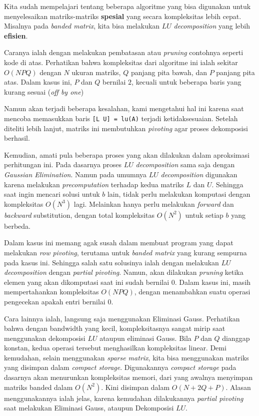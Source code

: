 \documentclass[12pt, a4paper, onecolumn, oneside, final]{report}
\begin{document}
Kita sudah mempelajari tentang beberapa algoritme yang bisa digunakan untuk menyelesaikan matriks-matriks \textbf{spesial} yang secara kompleksitas lebih cepat. Misalnya pada \textit{banded matrix}, kita bisa melakukan $LU$ \textit{decomposition} yang lebih \textbf{efisien}.

Caranya ialah dengan melakukan pembatasan atau \textit{pruning} contohnya seperti kode di atas. Perhatikan bahwa kompleksitas dari algoritme ini ialah sekitar $O(NPQ)$ dengan $N$ ukuran matriks, $Q$ panjang pita bawah, dan $P$ panjang pita atas. Dalam kasus ini, $P$ dan $Q$ bernilai $2$, kecuali untuk beberapa baris yang kurang sesuai (\textit{off by one})

Namun akan terjadi beberapa kesalahan, kami mengetahui hal ini karena saat mencoba memasukkan baris \texttt{[L U] = lu(A)} terjadi ketidaksesuaian. Setelah diteliti lebih lanjut, matriks ini membutuhkan \textit{pivoting} agar proses dekomposisi berhasil.

Kemudian, amati pula beberapa proses yang akan dilakukan dalam aproksimasi perhitungan ini. Pada dasarnya proses $LU$ \textit{decomposition} sama saja dengan \textit{Gaussian Elimination}. Namun pada umumnya $LU$ \textit{decomposition} digunakan karena melakukan \textit{precomputation} terhadap kedua matriks $L$ dan $U$. Sehingga saat ingin mencari solusi untuk $b$ lain, tidak perlu melakukan komputasi dengan kompleksitas $O(N^3)$ lagi. Melainkan hanya perlu melakukan \textit{forward} dan \textit{backward} substitution, dengan total kompleksitas $O(N^2)$ untuk setiap $b$ yang berbeda.

Dalam kasus ini memang agak susah dalam membuat program yang dapat melakukan \textit{row pivoting}, terutama untuk \textit{banded matrix} yang kurang sempurna pada kasus ini. Sehingga salah satu solusinya ialah dengan melakukan $LU$ \textit{decomposition} dengan \textit{partial pivoting}. Namun, akan dilakukan \textit{pruning} ketika elemen yang akan dikomputasi saat ini sudah bernilai $0$. Dalam kasus ini, masih mempertahankan kompleksitas $O(NPQ)$, dengan menambahkan suatu operasi pengecekan apakah entri bernilai $0$.

Cara lainnya ialah, langsung saja menggunakan Eliminasi Gauss. Perhatikan bahwa dengan bandwidth yang kecil, kompleksitasnya sangat mirip saat menggunakan dekomposisi $LU$ ataupun eliminasi Gauss. Bila $P$ dan $Q$ dianggap konstan, kedua operasi tersebut menghasilkan kompleksitas linear. Demi kemudahan, selain menggunakan \textit{sparse matrix}, kita bisa menggunakan matriks yang disimpan dalam \textit{compact storage}. Digunakannya \textit{compact storage} pada dasarnya akan menurunkan kompleksitas memori, dari yang awalnya menyimpan matriks banded dalam $O(N^2)$. Kini disimpan dalam $O(N+2Q+P)$. Alasan menggunakannya ialah jelas, karena kemudahan dilakukannya \textit{partial pivoting} saat melakukan Eliminasi Gauss, ataupun Dekomposisi $LU$.
\end{document}
